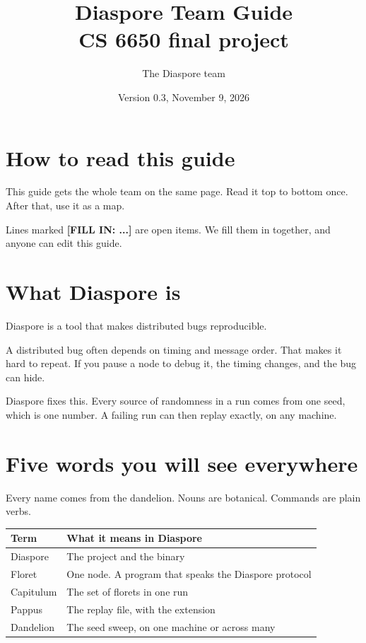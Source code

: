 \documentclass[12pt,letterpaper]{article}
\title{\textbf{Diaspore Team Guide}\\[0.3em]\large CS 6650 final project}
\author{The Diaspore team}
\date{Version 0.3, November 9, 2026}
\newcommand{\code}[1]{\texttt{\detokenize{#1}}}
\newcommand{\fillin}[1]{\textbf{[FILL IN: #1]}}
\begin{document}
\maketitle

\section*{How to read this guide}

This guide gets the whole team on the same page. Read it top to bottom once. After that, use it as a map.

Lines marked \fillin{...} are open items. We fill them in together, and anyone can edit this guide.

\tableofcontents

\newpage

\section{What Diaspore is}

Diaspore is a tool that makes distributed bugs reproducible.

A distributed bug often depends on timing and message order. That makes it hard to repeat. If you pause a node to debug it, the timing changes, and the bug can hide.

Diaspore fixes this. Every source of randomness in a run comes from one seed, which is one number. A failing run can then replay exactly, on any machine.

\section{Five words you will see everywhere}

Every name comes from the dandelion. Nouns are botanical. Commands are plain verbs.

\begin{center}
\begin{tabularx}{\linewidth}{@{}l X@{}}
\toprule
\textbf{Term} & \textbf{What it means in Diaspore} \\
\midrule
Diaspore & The project and the binary \\
Floret & One node. A program that speaks the Diaspore protocol \\
Capitulum & The set of florets in one run \\
Pappus & The replay file, with the \code{.pappus} extension \\
Dandelion & The seed sweep, on one machine or across many \\
\bottomrule
\end{tabularx}
\end{center}
\end{document}
